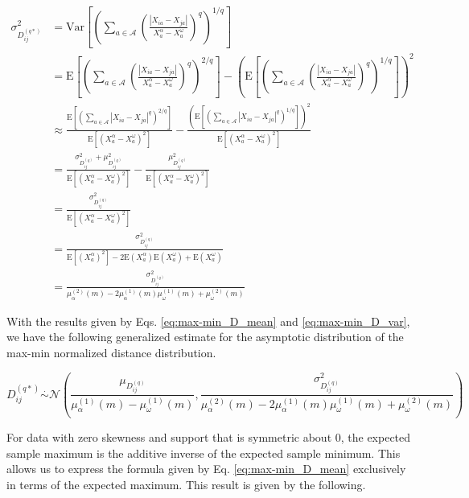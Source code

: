 \documentclass[10pt,letterpaper]{article}\usepackage[]{graphicx}\usepackage[]{color}
\begin{document}
\begin{equation}\label{eq:max-min_D_var}
\begin{aligned}
\sigma^2_{D^{(q*)}_{ij}} &= \text{Var}\left[\left(\sum_{a \in \mathcal{A}}\left(\frac{|X_{ia} - X_{ja}|}{X^\alpha_a - X^\omega_a}\right)^q\right)^{1/q}\right] \\
&= \text{E}\left[\left(\sum_{a \in \mathcal{A}}\left(\frac{|X_{ia} - X_{ja}|}{X^\alpha_a - X^\omega_a}\right)^q\right)^{2/q}\right] - \left(\text{E}\left[\left(\sum_{a \in \mathcal{A}}\left(\frac{|X_{ia} - X_{ja}|}{X^\alpha_a - X^\omega_a}\right)^q\right)^{1/q}\right]\right)^2 \\
&\approx \frac{\text{E}\left[\left(\displaystyle \sum_{a \in \mathcal{A}}|X_{ia} - X_{ja}|^q\right)^{2/q}\right]}{\text{E}[(X^\alpha_a - X^\omega_a)^2]} - \frac{\left(\text{E}\left[\left(\displaystyle \sum_{a \in \mathcal{A}}|X_{ia} - X_{ja}|^q\right)^{1/q}\right]\right)^2}{\text{E}[(X^\alpha_a - X^\omega_a)^2]} \\
&= \frac{\sigma^2_{D^{(q)}_{ij}} + \mu^2_{D^{(q)}_{ij}}}{\text{E}[(X^\alpha_a - X^\omega_a)^2]} - \frac{\mu^2_{D^{(q)}_{ij}}}{\text{E}[(X^\alpha_a - X^\omega_a)^2]} \\
&= \frac{\sigma^2_{D^{(q)}_{ij}}}{\text{E}[(X^\alpha_a - X^\omega_a)^2]} \\
&= \frac{\sigma^2_{D^{(q)}_{ij}}}{\text{E}[(X^\alpha_a)^2] - 2\text{E}(X^\alpha_a)\text{E}(X^\omega_a) + \text{E}(X^\omega_a)} \\
&= \frac{\sigma^2_{D^{(q)}_{ij}}}{\mu^{(2)}_\alpha(m) - 2\mu^{(1)}_\alpha(m)\mu^{(1)}_\omega(m) + \mu^{(2)}_\omega(m)}
\end{aligned}
\end{equation}

With the results given by Eqs. \ref{eq:max-min_D_mean} and \ref{eq:max-min_D_var}, we have the following generalized estimate for the asymptotic distribution of the max-min normalized distance distribution.

\begin{equation}\label{eq:max-min-DDistr-general}
D^{(q*)}_{ij} \overset{.}{\sim} \mathcal{N}\left(\frac{\mu_{D^{(q)}_{ij}}}{\mu^{(1)}_\alpha(m) - \mu^{(1)}_\omega(m)}, \frac{\sigma^2_{D^{(q)}_{ij}}}{\mu^{(2)}_\alpha(m) - 2 \mu^{(1)}_\alpha(m) \mu^{(1)}_\omega(m) + \mu^{(2)}_\omega(m)}\right)
\end{equation}

For data with zero skewness and support that is symmetric about 0, the expected sample maximum is the additive inverse of the expected sample minimum. This allows us to express the formula given by Eq. \ref{eq:max-min_D_mean} exclusively in terms of the expected maximum. This result is given by the following.
\end{document}
